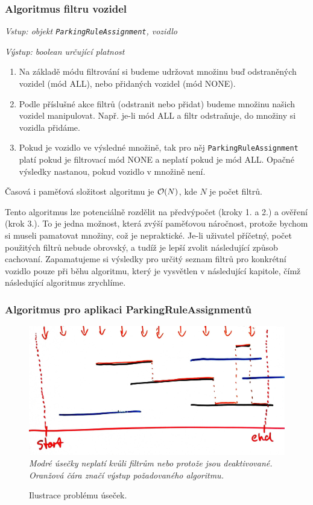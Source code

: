 \subsubsection*{Algoritmus filtru vozidel}

\textit{Vstup: objekt \texttt{ParkingRuleAssignment}, vozidlo}

\textit{Výstup: boolean určující platnost}
\begin{enumerate}
  \item Na základě módu filtrování si budeme udržovat množinu buď odstraněných vozidel (mód ALL), nebo přidaných vozidel (mód NONE).
  \item Podle příslušné akce filtrů (odstranit nebo přidat) budeme množinu našich vozidel manipulovat. Např. je-li mód ALL a filtr odstraňuje, do množiny si vozidla přidáme.
  \item Pokud je vozidlo ve výsledné množině, tak pro něj \texttt{ParkingRuleAssignment} platí pokud je filtrovací mód NONE a neplatí pokud je mód ALL. Opačné výsledky nastanou, pokud vozidlo v množině není.
\end{enumerate}

Časová i paměťová složitost algoritmu je ${\cal O}(N)$, kde $N$ je počet filtrů.

Tento algoritmus lze potenciálně rozdělit na předvýpočet (kroky 1. a 2.) a ověření (krok 3.).
To je jedna možnost, která zvýší paměťovou náročnost, protože bychom si museli pamatovat množiny, což je nepraktické.
Je-li uživatel příčetný, počet použitých filtrů nebude obrovský, a tudíž je lepší zvolit následující způsob cachovaní.
Zapamatujeme si výsledky pro určitý seznam filtrů pro konkrétní vozidlo pouze při běhu algoritmu, který je
vysvětlen v následující kapitole, čímž následující algoritmus zrychlíme.

\subsubsection*{Algoritmus pro aplikaci ParkingRuleAssignmentů}

\begin{figure}[!htb] \centering
  \includegraphics[width=145mm]{../img/rules_drawing.jpg}
  \textit{Modré úsečky neplatí kvůli filtrům nebo protože jsou deaktivované. Oranžová čára značí výstup požadovaného algoritmu.}
  \caption{Ilustrace problému úseček.}
  \label{fig:rules_drawing}
\end{figure}


